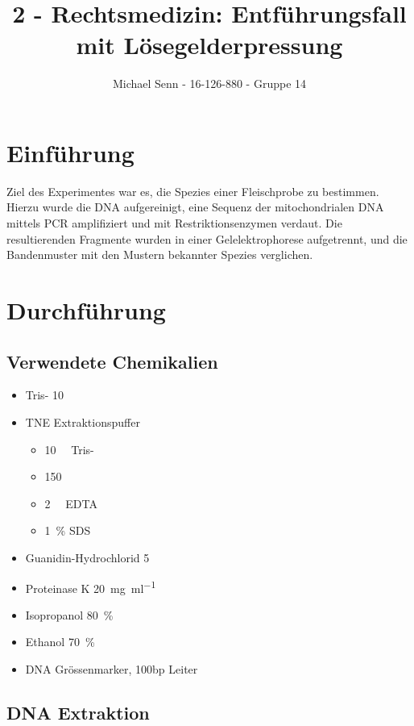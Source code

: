 \documentclass[a4paper,english]{scrreprt}
\title{2 - Rechtsmedizin: Entführungsfall mit Lösegelderpressung}
\author{Michael Senn \maillink{michael.senn@students.unibe.ch} - 16-126-880 - Gruppe 14}
\date{\printdate}
\begin{document}
\maketitle

\chapter{Einführung}

Ziel des Experimentes war es, die Spezies einer Fleischprobe zu bestimmen.
Hierzu wurde die DNA aufgereinigt, eine Sequenz der mitochondrialen DNA mittels
PCR amplifiziert und mit Restriktionsenzymen verdaut. Die resultierenden
Fragmente wurden in einer Gelelektrophorese aufgetrennt, und die Bandenmuster
mit den Mustern bekannter Spezies verglichen.

\chapter{Durchführung\cite{skriptv2}}

\section{Verwendete Chemikalien}

\begin{itemize}
	\item Tris- \SI{10}{\milli\Molar}
	\item TNE Extraktionspuffer
		\begin{itemize}
			\item \SI{10}{\milli\Molar} Tris-
			\item \SI{150}{\milli\Molar} 
			\item \SI{2}{\milli\Molar} EDTA
			\item \SI{1}{\percent} SDS
		\end{itemize}
	\item Guanidin-Hydrochlorid \SI{5}{\Molar}
	\item Proteinase K \SI{20}{\mg \per \ml}
	\item Isopropanol \SI{80}{\percent}
	\item Ethanol \SI{70}{\percent}
	\item DNA Grössenmarker, 100bp Leiter
\end{itemize}

\section{DNA Extraktion}
\end{document}
